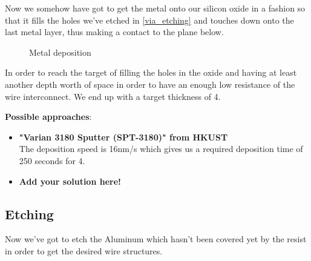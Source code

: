 Now we somehow have got to get the metal onto our silicon oxide in a fashion so that it fills the holes we've etched in \autoref{via_etching} and touches down onto the last metal layer, thus making a contact to the plane below.

\begin{figure}[H]
	\centering
	\begin{tikzpicture}[node distance = 3cm, auto, thick,scale=\CrossSectionOnly, every node/.style={transform shape}]
		
	\end{tikzpicture}
	\drawStepArrow{}
	\begin{tikzpicture}[node distance = 3cm, auto, thick,scale=\CrossSectionOnly, every node/.style={transform shape}]
		
	\end{tikzpicture}
	\caption{Metal deposition}
\end{figure}

In order to reach the target of filling the holes in the oxide and having at least another depth worth of space in order to have an enough low resistance of the wire interconnect.
We end up with a target thickness of 4\um.

\textbf{Possible approaches}:
\begin{itemize}
	\item \textbf{"Varian 3180 Sputter (SPT-3180)" from HKUST} \\
	The deposition speed is 16nm/s which gives us a required deposition time of 250 seconds for 4\um.
	\item \textbf{Add your solution here!}
\end{itemize}

\newpage

\subsection{Etching}\label{more_metal_wire_etch}

Now we've got to etch the Aluminum which hasn't been covered yet by the resist in order to get the desired wire structures.

